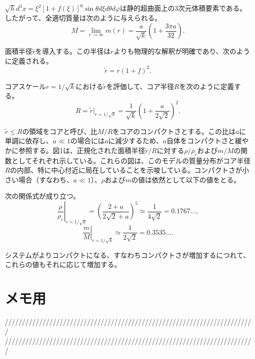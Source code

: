 \documentclass[dvipdfmx]{report} %
\begin{document}
$\sqrt{h} d^3x = \xi^2 [1 + f(\xi)]^6 \sin \theta d\xi d\theta d\varphi$は静的超曲面上の3次元体積要素である。したがって、全適切質量は次のように与えられる。
\begin{equation}
    M = \lim_{r \to \infty} m(r) = \frac{a}{\sqrt{k}} \left( 1 + \frac{3\pi a}{32} \right).
\end{equation}

面積半径$\tilde{r}$を導入する。この半径は$r$よりも物理的な解釈が明確であり、次のように定義される。
\begin{equation}
    \tilde{r} = r (1 + f)^2.
\end{equation}

コアスケール$r = 1/\sqrt{k}$における$\tilde{r}$を評価して、コア半径$R$を次のように定義する。
\begin{equation}
    R = \tilde{r} \bigg|_{r = 1/\sqrt{k}} = \frac{1}{\sqrt{k}} \left( 1 + \frac{a}{2\sqrt{2}} \right)^2.
\end{equation}

$\tilde{r} \leq R$の領域をコアと呼び、比$M/R$をコアのコンパクトさとする。この比は$a$に単調に依存し、$a \ll 1$の場合には$a$に減少するため、$a$自体をコンパクトさと緩やかに参照する。図1は、正規化された面積半径$\tilde{r}/R$に対する$\rho/\rho_c$および$m/M$の関数としてそれぞれ示している。これらの図は、このモデルの質量分布がコア半径$R$の内部、特に中心付近に局在していることを示唆している。コンパクトさが小さい場合（すなわち、$a \ll 1$）、$\rho$および$m$の値は依然として以下の値をとる。

次の関係式が成り立つ。
\begin{equation}
    \left. \frac{\rho}{\rho_c} \right|_{r = 1/\sqrt{k}} = \left( \frac{2 + a}{2\sqrt{2} + a} \right)^5 \simeq \frac{1}{4\sqrt{2}} = 0.1767\ldots,
\end{equation}
\begin{equation}
    \left. \frac{m}{M} \right|_{r = 1/\sqrt{k}} \simeq \frac{1}{2\sqrt{2}} = 0.3535\ldots.
\end{equation}

システムがよりコンパクトになる、すなわちコンパクトさが増加するにつれて、これらの値もそれに応じて増加する。


\newpage
\section{メモ用}
/////////////////////////////////////////////////////////////////////////\\
/////////////////////////////////////////////////////////////////////////
\end{document}
